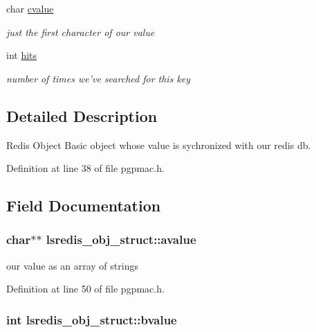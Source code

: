 \begin{DoxyCompactItemize}
$$char \hyperlink{structlsredis__obj__struct_a4a5933dbd44d33d9f594f6020a443b69}{cvalue}
\begin{DoxyCompactList}\small\item\em just the first character of our value \end{DoxyCompactList}\item 
int \hyperlink{structlsredis__obj__struct_a43fcbff584654ab086d973ce34cb6ddc}{hits}
\begin{DoxyCompactList}\small\item\em number of times we've searched for this key \end{DoxyCompactList}\end{DoxyCompactItemize}


\subsection{Detailed Description}
Redis Object Basic object whose value is sychronized with our redis db. 

Definition at line 38 of file pgpmac.\-h.



\subsection{Field Documentation}
\hypertarget{structlsredis__obj__struct_ac065eeede0e08f25bcfedd45022fe593}{
\subsubsection[{avalue}]{\setlength{\rightskip}{0pt plus 5cm}char$\ast$$\ast$ lsredis\-\_\-obj\-\_\-struct\-::avalue}}\label{structlsredis__obj__struct_ac065eeede0e08f25bcfedd45022fe593}


our value as an array of strings 



Definition at line 50 of file pgpmac.\-h.

\hypertarget{structlsredis__obj__struct_ac3df3eaa275c1e8e333024c1fa8353af}{
\subsubsection[{bvalue}]{\setlength{\rightskip}{0pt plus 5cm}int lsredis\-\_\-obj\-\_\-struct\-::bvalue}}\label{structlsredis__obj__struct_ac3df3eaa275c1e8e333024c1fa8353af}



